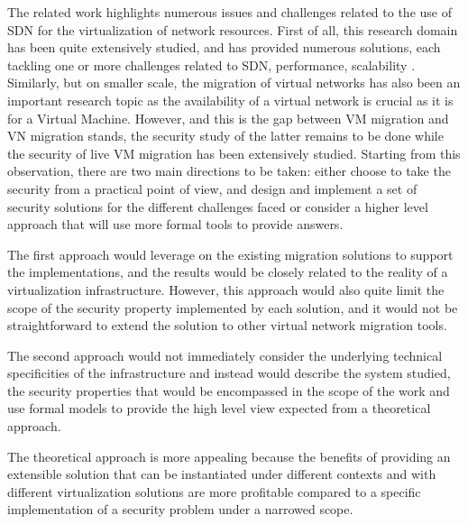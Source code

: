 The related work highlights numerous issues and challenges related to the use of SDN for the virtualization of network resources.
First of all, this research domain has been quite extensively studied, and has provided numerous solutions, each tackling one or more challenges related to SDN, performance, scalability \etc.
Similarly, but on smaller scale, the migration of virtual networks has also been an important research topic as the availability of a virtual network is crucial as it is for a Virtual Machine.
However, and this is the gap between VM migration and VN migration stands, the security study of the latter remains to be done while the security of live VM migration has been extensively studied.
Starting from this observation, there are two main directions to be taken: either choose to take the security from a practical point of view, and design and implement a set of security solutions for the different challenges faced or consider a higher level approach that will use more formal tools to provide answers. 

The first approach would leverage on the existing migration solutions to support the implementations, and the results would be closely related to the reality of a virtualization infrastructure. However, this approach would also quite limit the scope of the security property implemented by each solution, and it would not be straightforward to extend the solution to other virtual network migration tools.

The second approach would not immediately consider the underlying technical specificities of the infrastructure and instead would describe the system studied, the security properties that would be encompassed in the scope of the work and use formal models to provide the high level view expected from a theoretical approach.

The theoretical approach is more appealing because the benefits of providing an extensible solution that can be instantiated under different contexts and with different virtualization solutions are more profitable compared to a specific implementation of a security problem under a narrowed scope.

